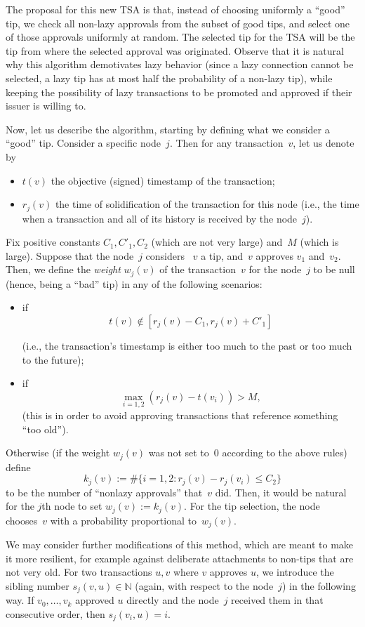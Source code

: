 \documentclass[../main.tex]{subfiles}
\begin{document}
The proposal for this new TSA is that, instead of choosing uniformly a ``good'' tip, we check all non-lazy approvals from the subset of good tips, and select one of those approvals uniformly at random. The selected tip for the TSA will be the tip from where the selected approval was originated. Observe that it is natural why this algorithm demotivates lazy behavior (since a lazy connection cannot be selected, a lazy tip has at most half the probability of a non-lazy tip), while keeping the possibility of lazy transactions to be promoted and approved if their issuer is willing to.

Now, let us describe the algorithm, starting by defining what we consider a ``good'' tip. Consider a specific node~$j$. Then for any transaction~$v$,
let us denote by
\begin{itemize}
 \item $t(v)$ the objective (signed) timestamp
 of the transaction;
 \item $r_j(v)$ the time of solidification of 
 the transaction for this node
 (i.e., the time when a transaction and all of its 
 history is received by the node~$j$).
\end{itemize}

Fix positive constants $C_1,C'_1,C_2$ (which are not very large)
and~$M$ (which is large). Suppose that the node~$j$ considers ~$v$ a tip,
and~$v$ approves $v_1$ and~$v_2$.
Then, we define the \emph{weight} $w_j(v)$ of the 
transaction~$v$ for the node~$j$ to be null (hence, being a ``bad'' tip) in any of the following
scenarios:
\begin{itemize}
 \item if 
 \[t(v)\notin  [r_j(v)-C_1,r_j(v)+C'_1]\]
 
 (i.e., the transaction's timestamp is either too much
 to the past or too much to the future);
 \item if
  \[
   \max_{i=1,2} (r_j(v)-t(v_i))>M,
  \]
  (this is in order to  avoid approving 
 transactions that reference something ``too old'').
\end{itemize}
Otherwise (if the weight $w_j(v)$ was not set
to~$0$ according to the above rules) define 
\[
 k_j(v) := \#\{i=1,2: r_j(v) - r_j(v_i)\leq C_2\}
\]
to be the number of ``nonlazy approvals'' that~$v$ did.
Then, it would be natural for the $j$th node 
to set $w_j(v):= k_j(v)$. For the tip selection,
the node chooses~$v$ with a probability proportional to~$w_j(v)$.

We may consider further modifications of this method, which 
are meant to make it more resilient, for example against deliberate 
attachments to non-tips that are not very old.
For two transactions $u,v$ where $v$ approves $u$,
we introduce the sibling number $s_j(v,u)\in \mathbb{N}$
(again, with respect to the node~$j$) in the following
way. If $v_0,\ldots ,v_k$ approved $u$ directly 
and the node~$j$ received them in that consecutive order, 
then $s_j(v_i,u)=i$.
\end{document}
